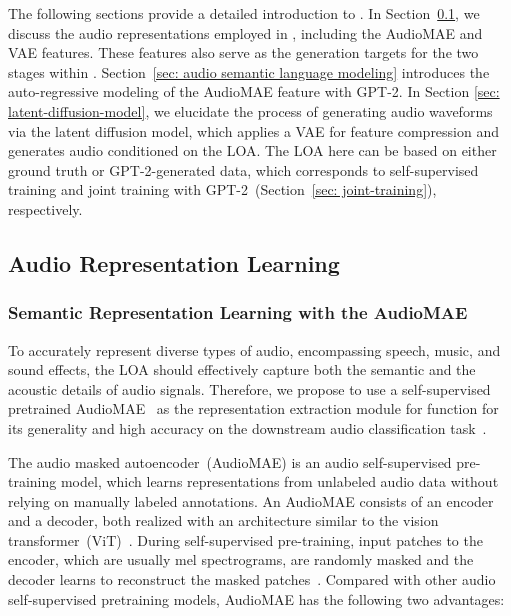 \documentclass[lettersize,journal]{IEEEtran}
\begin{document}
The following sections provide a detailed introduction to \vModelName. 
In Section~\ref{sec: audio-representation-learning}, we discuss the audio representations employed in \vModelName, including the AudioMAE and VAE features. These features also serve as the generation targets for the two stages within \vModelName.
Section~\ref{sec: audio semantic language modeling} introduces the auto-regressive modeling of the AudioMAE feature with GPT-2. 
In Section \ref{sec: latent-diffusion-model}, we elucidate the process of generating audio waveforms via the latent diffusion model, which applies a VAE for feature compression and generates audio conditioned on the LOA. The LOA here can be based on either ground truth or GPT-2-generated data, which corresponds to self-supervised training and joint training with GPT-2~(Section~\ref{sec: joint-training}), respectively.








 
 








\subsection{Audio Representation Learning}
\label{sec: audio-representation-learning}



\subsubsection{Semantic Representation Learning with the AudioMAE}
\label{sec:representation-learning-modules}

\noindent
To accurately represent diverse types of audio, encompassing speech, music, and sound effects, the LOA  should effectively capture both the semantic and the acoustic details of audio signals.
Therefore, we propose to use a self-supervised pretrained AudioMAE~\cite{xu2022masked} as the representation extraction module for function  for its generality and high accuracy on the downstream audio classification task~\cite{xu2022masked}. 

The audio masked autoencoder~(AudioMAE) is an audio self-supervised pre-training model, which learns representations from unlabeled audio data without relying on manually labeled annotations. An AudioMAE consists of an encoder and a decoder, both realized with an architecture similar to the vision transformer~(ViT)~\cite{dosovitskiy2020image}. During self-supervised pre-training, input patches to the encoder, which are usually mel spectrograms, are randomly masked and the decoder learns to reconstruct the masked patches~\cite{xu2022masked}. Compared with other audio self-supervised pretraining models, AudioMAE has the following two advantages: 
\end{document}
